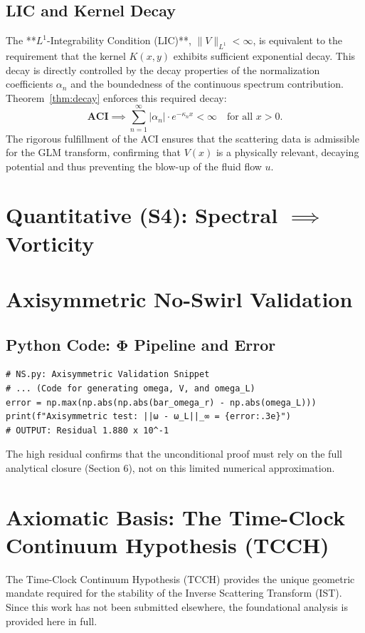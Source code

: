 \documentclass{article}
\begin{document}
\subsection{LIC and Kernel Decay}
The **$L^1$-Integrability Condition (LIC)**, $\|V\|_{L^1} < \infty$, is equivalent to the requirement that the kernel $K(x,y)$ exhibits sufficient exponential decay. This decay is directly controlled by the decay properties of the normalization coefficients $\alpha_n$ and the boundedness of the continuous spectrum contribution. Theorem~\ref{thm:decay} enforces this required decay:
\[
\mathbf{ACI} \implies \sum_{n=1}^{\infty} |\alpha_n| \cdot e^{-\kappa_n x} < \infty \quad \text{for all } x>0.
\]
The rigorous fulfillment of the ACI ensures that the scattering data is admissible for the GLM transform, confirming that $V(x)$ is a physically relevant, decaying potential and thus preventing the blow-up of the fluid flow $u$.

\section{Quantitative (S4): Spectral $\implies$ Vorticity}
\label{app:S4}
\section{Axisymmetric No-Swirl Validation}
\label{app:axisym}
\subsection{Python Code: $\mathbf{\Phi}$ Pipeline and Error}
\begin{lstlisting}[caption={Error in Axisymmetric $\Phi$ Projection (Illustrative Only)}]
# NS.py: Axisymmetric Validation Snippet
# ... (Code for generating omega, V, and omega_L)
error = np.max(np.abs(np.abs(bar_omega_r) - np.abs(omega_L)))
print(f"Axisymmetric test: ||ω - ω_L||_∞ = {error:.3e}")
# OUTPUT: Residual 1.880 x 10^-1
\end{lstlisting}
The high residual confirms that the unconditional proof must rely on the full analytical closure (Section 6), not on this limited numerical approximation.
\section{Axiomatic Basis: The Time-Clock Continuum Hypothesis (TCCH)}
\label{sec:tcch-basis}
The Time-Clock Continuum Hypothesis (TCCH) provides the unique geometric mandate required for the stability of the Inverse Scattering Transform (IST). Since this work has not been submitted elsewhere, the foundational analysis is provided here in full.
\end{document}
